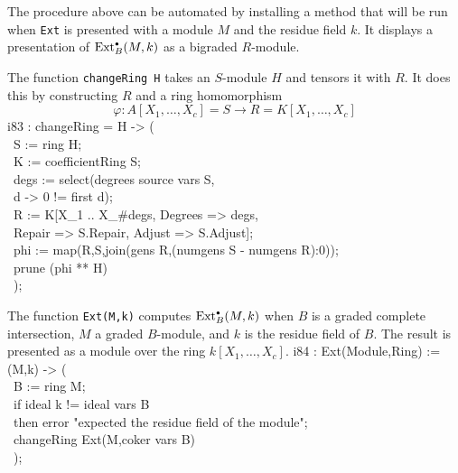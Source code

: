 The procedure above can be automated by installing a method that will
be run when {\tt Ext} is presented with a module $M$ and the residue
field $k$.  It displays a presentation of $\operatorname{Ext}_B^{\scriptscriptstyle\bullet}(M,k)$ as a bigraded
$R$-module.

\begin{sCode}
\label{change}
The function {\tt changeRing H} takes an $S$-module $H$ and tensors it
with $R$.  It does this by constructing $R$ and a ring homomorphism
\[
\varphi\colon A[X_1,\dots,X_c] = S \to R = K[X_1,\dots,X_c]
\]
\beginOutput
i83 : changeRing = H -> (\\
\         S := ring H;\\
\         K := coefficientRing S;\\
\         degs := select(degrees source vars S,\\
\              d -> 0 != first d);\\
\         R := K[X_1 .. X_#degs, Degrees => degs,\\
\              Repair => S.Repair, Adjust => S.Adjust];\\
\         phi := map(R,S,join(gens R,(numgens S - numgens R):0));\\
\         prune (phi ** H)\\
\         );\\
\endOutput
\end{sCode}

\begin{sCode}
\label{cohomology}
The function {\tt Ext(M,k)} computes $\operatorname{Ext}_B^{\scriptscriptstyle\bullet}(M,k)$ when $B$ is a
graded complete intersection, $M$ a graded $B$-module, and $k$ is the
residue field of $B$.  The result is presented as a module over the
ring $k[X_1,\dots,X_c]$.
\beginOutput
i84 : Ext(Module,Ring) := (M,k) -> (\\
\         B := ring M;\\
\         if ideal k != ideal vars B\\
\         then error "expected the residue field of the module";\\
\         changeRing Ext(M,coker vars B)\\
\         );\\
\endOutput
\end{sCode}

